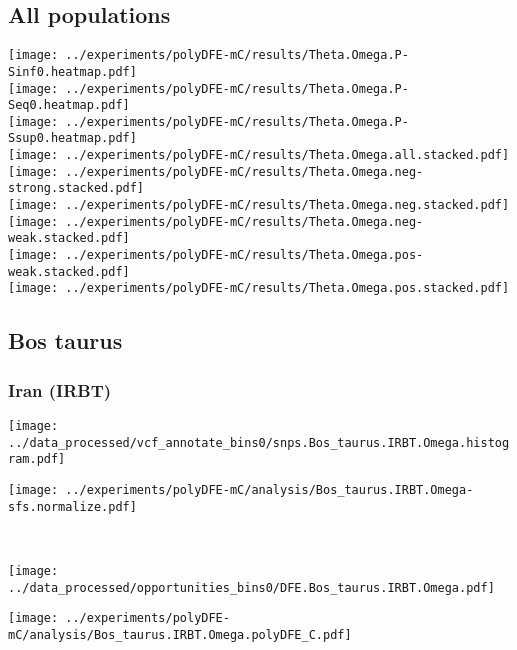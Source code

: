 \subsection{All populations}
\begin{center}
    \texttt{[image: ../experiments/polyDFE-mC/results/Theta.Omega.P-Sinf0.heatmap.pdf]} \\
    \texttt{[image: ../experiments/polyDFE-mC/results/Theta.Omega.P-Seq0.heatmap.pdf]} \\
    \texttt{[image: ../experiments/polyDFE-mC/results/Theta.Omega.P-Ssup0.heatmap.pdf]} \\
    \texttt{[image: ../experiments/polyDFE-mC/results/Theta.Omega.all.stacked.pdf]} \\
    \texttt{[image: ../experiments/polyDFE-mC/results/Theta.Omega.neg-strong.stacked.pdf]} \\
    \texttt{[image: ../experiments/polyDFE-mC/results/Theta.Omega.neg.stacked.pdf]} \\
    \texttt{[image: ../experiments/polyDFE-mC/results/Theta.Omega.neg-weak.stacked.pdf]} \\
    \texttt{[image: ../experiments/polyDFE-mC/results/Theta.Omega.pos-weak.stacked.pdf]} \\
    \texttt{[image: ../experiments/polyDFE-mC/results/Theta.Omega.pos.stacked.pdf]}
\end{center}

\subsection{Bos taurus}

\subsubsection{Iran (IRBT)}

\begin{minipage}{0.49\linewidth}
    \texttt{[image: ../data\_processed/vcf\_annotate\_bins0/snps.Bos\_taurus.IRBT.Omega.histogram.pdf]}
\end{minipage}
\begin{minipage}{0.49\linewidth}
    \texttt{[image: ../experiments/polyDFE-mC/analysis/Bos\_taurus.IRBT.Omega-sfs.normalize.pdf]}
\end{minipage}
\\
\begin{minipage}{0.49\linewidth}
    \texttt{[image: ../data\_processed/opportunities\_bins0/DFE.Bos\_taurus.IRBT.Omega.pdf]}
\end{minipage}
\begin{minipage}{0.49\linewidth}
    \texttt{[image: ../experiments/polyDFE-mC/analysis/Bos\_taurus.IRBT.Omega.polyDFE\_C.pdf]}
\end{minipage}
\\

